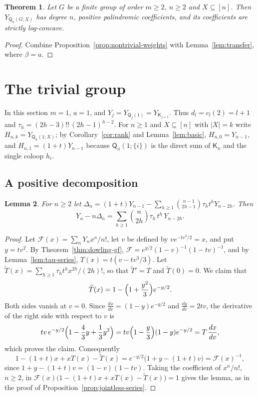 \documentclass[11pt]{amsart}
\newtheorem{theorem}{Theorem}[section]
\newtheorem{lemma}[theorem]{Lemma}
\theoremstyle{definition}
\theoremstyle{remark}
\numberwithin{equation}{section}
\newcommand{\Q}{\mathsf{Q}}
\newcommand{\K}{\mathsf{K}}
\begin{document}
\begin{theorem}\label{thm:nontrivial}
Let $G$ be a finite group of order $m\ge2$, $n\ge2$ and $X\subseteq[n]$. Then $Y_{\Q_n(G;X)}$ has degree $n$, positive palindromic coefficients, and its coefficients are strictly log-concave.
\end{theorem}

\begin{proof}
Combine Proposition~\ref{prop:nontrivial-weights} with Lemma~\ref{lem:transfer}, where $\beta=a$.
\end{proof}

\section{The trivial group}\label{sec:trivial}

In this section $m=1$, $a=1$, and $Y_j=Y_{\Q_j(1)}=Y_{\K_{j+1}}$. Thus $d_l=c_l(2)=l+1$ and $\tau_h=(2h-3)!!\,(2h-1)^{h-2}$. For $n\ge1$ and $X\subseteq[n]$ with $|X|=k$ write $H_{n,k}=Y_{\Q_n(1;X)}$; by Corollary~\ref{cor:rank} and Lemma~\ref{lem:basic}, $H_{n,0}=Y_{n-1}$, and $H_{n,1}=(1+t)Y_{n-1}$ because $\Q_n(1;\{i\})$ is the direct sum of $\K_n$ and the single coloop $h_i$.

\subsection{A positive decomposition}

\begin{lemma}\label{lem:braid-identity}
For $n\ge2$ let $\Delta_n=(1+t)Y_{n-1}-\sum_{h\ge1}\binom{n-1}{2h-1}\tau_ht^hY_{n-2h}$. Then
\[
Y_n-n\Delta_n=\sum_{h\ge1}\binom n{2h}\tau_h\,t^h\,Y_{n-2h}.
\]
\end{lemma}

\begin{proof}
Let $\mathcal{F}(x)=\sum_nY_nx^n/n!$, let $v$ be defined by $ve^{-tv^2/2}=x$, and put $y=tv^2$. By Theorem~\ref{thm:dowling-gf}, $\mathcal{F}=e^{y/2}(1-v)^{-1}(1-tv)^{-1}$, and by Lemma~\ref{lem:tau-series}, $T(x)=t(v-tv^3/3)$. Let $\widetilde T(x)=\sum_{h\ge1}\tau_ht^hx^{2h}/(2h)!$, so that $\widetilde T'=T$ and $\widetilde T(0)=0$. We claim that
\[
\widetilde T(x)=1-\Bigl(1+\frac{y^2}3\Bigr)e^{-y/2}.
\]
Both sides vanish at $v=0$. Since $\frac{dx}{dv}=(1-y)e^{-y/2}$ and $\frac{dy}{dv}=2tv$, the derivative of the right side with respect to $v$ is
\[
tv\,e^{-y/2}\Bigl(1-\frac43y+\frac13y^2\Bigr)=tv\Bigl(1-\frac y3\Bigr)(1-y)e^{-y/2}=T\,\frac{dx}{dv},
\]
which proves the claim. Consequently
\[
1-(1+t)x+xT(x)-\widetilde T(x)=e^{-y/2}\bigl(1+y-(1+t)v\bigr)=\mathcal{F}(x)^{-1},
\]
since $1+y-(1+t)v=(1-v)(1-tv)$.
Taking the coefficient of $x^n/n!$, $n\ge2$, in $\mathcal F(x)\bigl(1-(1+t)x+xT(x)-\widetilde T(x)\bigr)=1$ gives the lemma, as in the proof of Proposition~\ref{prop:jointless-series}.
\end{proof}
\end{document}
